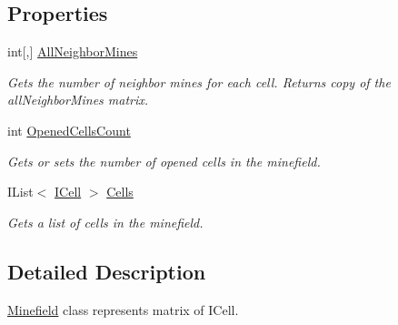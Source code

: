 \subsection*{Properties}
\begin{DoxyCompactItemize}
\item 
int\mbox{[},\mbox{]} \hyperlink{class_minesweeper_1_1_game_1_1_minefield_a6b62b86faae0edee06d71b14790661f1}{All\+Neighbor\+Mines}
\begin{DoxyCompactList}\small\item\em Gets the number of neighbor mines for each cell. Returns copy of the all\+Neighbor\+Mines matrix. \end{DoxyCompactList}\item 
int \hyperlink{class_minesweeper_1_1_game_1_1_minefield_a3fabf570d9045ea288bb06fd1ecea287}{Opened\+Cells\+Count}
\begin{DoxyCompactList}\small\item\em Gets or sets the number of opened cells in the minefield. \end{DoxyCompactList}\item 
I\+List$<$ \hyperlink{interface_minesweeper_1_1_lib_1_1_i_cell}{I\+Cell} $>$ \hyperlink{class_minesweeper_1_1_game_1_1_minefield_a6308163a3dc8ed1f5681de4bbd184788}{Cells}
\begin{DoxyCompactList}\small\item\em Gets a list of cells in the minefield. \end{DoxyCompactList}\end{DoxyCompactItemize}


\subsection{Detailed Description}
\hyperlink{class_minesweeper_1_1_game_1_1_minefield}{Minefield} class represents matrix of I\+Cell. 



